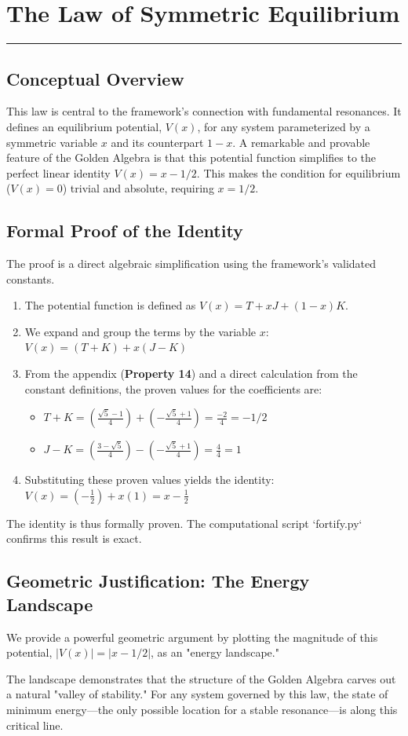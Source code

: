 \section{The Law of Symmetric Equilibrium}
\label{sec:symmetric_equilibrium}
\hrule
\vspace{1em}

\vspace{0.5cm}

\subsection*{Conceptual Overview}
This law is central to the framework's connection with fundamental resonances. It defines an equilibrium potential, $V(x)$, for any system parameterized by a symmetric variable $x$ and its counterpart $1-x$. A remarkable and provable feature of the Golden Algebra is that this potential function simplifies to the perfect linear identity $V(x) = x - 1/2$. This makes the condition for equilibrium ($V(x)=0$) trivial and absolute, requiring $x=1/2$.

\subsection*{Formal Proof of the Identity}
The proof is a direct algebraic simplification using the framework's validated constants.
\begin{enumerate}
    \item The potential function is defined as $V(x) = T + xJ + (1-x)K$.
    \item We expand and group the terms by the variable $x$:
    $ V(x) = (T+K) + x(J-K) $
    \item From the appendix (\textbf{Property 14}) and a direct calculation from the constant definitions, the proven values for the coefficients are:
    \begin{itemize}
        \item $T+K = (\frac{\sqrt{5}-1}{4}) + (-\frac{\sqrt{5}+1}{4}) = \frac{-2}{4} = -1/2$
        \item $J-K = (\frac{3-\sqrt{5}}{4}) - (-\frac{\sqrt{5}+1}{4}) = \frac{4}{4} = 1$
    \end{itemize}
    \item Substituting these proven values yields the identity:
    $ V(x) = \left(-\frac{1}{2}\right) + x(1) = x - \frac{1}{2} $
\end{enumerate}
The identity is thus formally proven. The computational script `fortify.py` confirms this result is exact.

\subsection*{Geometric Justification: The Energy Landscape}
We provide a powerful geometric argument by plotting the magnitude of this potential, $|V(x)| = |x - 1/2|$, as an "energy landscape."

The landscape demonstrates that the structure of the Golden Algebra carves out a natural "valley of stability." For any system governed by this law, the state of minimum energy—the only possible location for a stable resonance—is along this critical line.